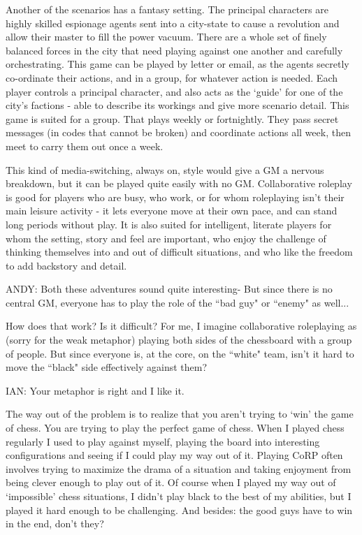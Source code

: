 \documentclass[twoside]{book}
\begin{document}
\begin{description}
Another of the scenarios has a fantasy setting. The principal characters are highly skilled espionage agents sent into a city-state to cause a revolution and allow their master to fill the power vacuum. There are a whole set of finely balanced forces in the city that need playing against one another and carefully orchestrating. This game can be played by letter or email, as the agents secretly co-ordinate their actions, and in a group, for whatever action is needed. Each player controls a principal character, and also acts as the `guide' for one of the city's factions - able to describe its workings and give more scenario detail. This game is suited for a group. That plays weekly or fortnightly. They pass secret messages (in codes that cannot be broken) and coordinate actions all week, then meet to carry them out once a week.

This kind of media-switching, always on, style would give a GM a nervous breakdown, but it can be played quite easily with no GM. Collaborative roleplay is good for players who are busy, who work, or for whom roleplaying isn't their main leisure activity - it lets everyone move at their own pace, and can stand long periods without play. It is also suited for intelligent, literate players for whom the setting, story and feel are important, who enjoy the challenge of thinking themselves into and out of difficult situations, and who like the freedom to add backstory and detail.

\item{ANDY:} Both these adventures sound quite interesting- But since there is no central GM, everyone has to play the role of the ``bad guy" or ``enemy" as well...

How does that work? Is it difficult? For me, I imagine collaborative roleplaying as (sorry for the weak metaphor) playing both sides of the chessboard with a group of people. But since everyone is, at the core, on the ``white" team, isn't it hard to move the ``black" side effectively against them?

\item{IAN:} Your metaphor is right and I like it.

The way out of the problem is to realize that you aren't trying to `win' the game of chess. You are trying to play the perfect game of chess. When I played chess regularly I used to play against myself, playing the board into interesting configurations and seeing if I could play my way out of it. Playing CoRP often involves trying to maximize the drama of a situation and taking enjoyment from being clever enough to play out of it. Of course when I played my way out of `impossible' chess situations, I didn't play black to the best of my abilities, but I played it hard enough to be challenging. And besides: the good guys have to win in the end, don't they?


\end{description}
\end{document}
